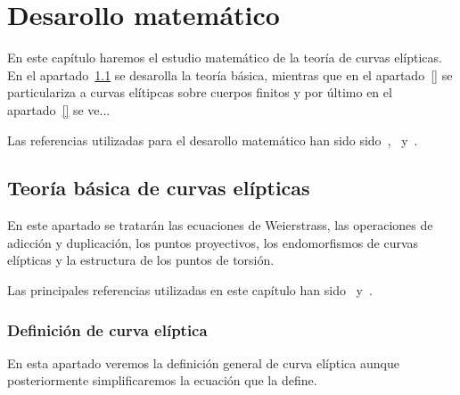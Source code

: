 \chapter{Desarollo matemático}
\label{ch:Desarollo matemático}



En este capítulo haremos el estudio matemático de la teoría de curvas elípticas. En el apartado~\ref{sec:Teoría básica de curvas elípticas} se desarolla la teoría básica, mientras que en el apartado~\ref{} se particulariza a curvas elítipcas sobre cuerpos finitos y por último en el apartado~\ref{} se ve...

Las referencias utilizadas para el desarollo matemático han sido sido~\cite{Washington:2008},~\cite{Hankerson:2003} y~\cite{Silverman:2009}.

\section{Teoría básica de curvas elípticas}
\label{sec:Teoría básica de curvas elípticas}

En este apartado se tratarán las ecuaciones de Weierstrass, las operaciones de adicción y duplicación, los puntos proyectivos, los endomorfismos de curvas elípticas y la estructura de los puntos de torsión.

Las principales referencias utilizadas en este capítulo han sido~\cite[cap. 2]{Washington:2008} y~\cite[cap. 3]{Hankerson:2003}.

\subsection{Definición de curva elíptica}
\label{sub:Definición de curva elíptica}

En esta apartado veremos la definición general de curva elíptica aunque posteriormente simplificaremos la ecuación que la define.

